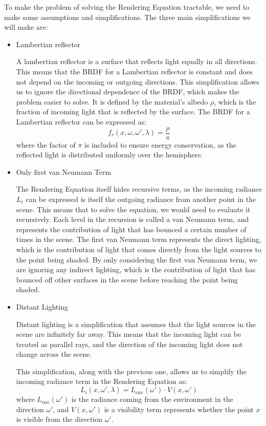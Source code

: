 To make the problem of solving the Rendering Equation tractable, we need to make some assumptions and simplifications. The three main simplifications we will make are:
\begin{itemize}
    \item Lambertian reflector
    
    A lambertian reflector is a surface that reflects light equally in all directions. This means that the BRDF for a Lambertian reflector is constant and does not depend on the incoming or outgoing directions. This simplification allows us to ignore the directional dependence of the BRDF, which makes the problem easier to solve. It is defined by the material's albedo $\rho$, which is the fraction of incoming light that is reflected by the surface. The BRDF for a Lambertian reflector can be expressed as:
\begin{equation*}
    f_r(x, \omega, \omega', \lambda) = \frac{\rho}{\pi}
\end{equation*}
    where the factor of $\pi$ is included to ensure energy conservation, as the reflected light is distributed uniformly over the hemisphere.


    \item Only first van Neumann Term
    
    The Rendering Equation itself hides recursive terms, as the incoming radiance $L_i$ can be expressed is itself the outgoing radiance from another point in the scene. This means that to solve the equation, we would need to evaluate it recursively. Each level in the recursion is called a van Neumann term, and represents the contribution of light that has bounced a certain number of times in the scene. The first van Neumann term represents the direct lighting, which is the contribution of light that comes directly from the light sources to the point being shaded. By only considering the first van Neumann term, we are ignoring any indirect lighting, which is the contribution of light that has bounced off other surfaces in the scene before reaching the point being shaded.

    \item Distant Lighting
    
    Distant lighting is a simplification that assumes that the light sources in the scene are infinitely far away. This means that the incoming light can be treated as parallel rays, and the direction of the incoming light does not change across the scene.

    This simplification, along with the previous one, allows us to simplify the incoming radiance term in the Rendering Equation as:
\begin{equation*}
    L_i(x, \omega', \lambda) = L_{\text{env}}(\omega')\cdot V(x, \omega')
\end{equation*}
    where $L_{\text{env}}(\omega')$ is the radiance coming from the environment in the direction $\omega'$, and $V(x, \omega')$ is a visibility term represents whether the point $x$ is visible from the direction $\omega'$.
\end{itemize}


